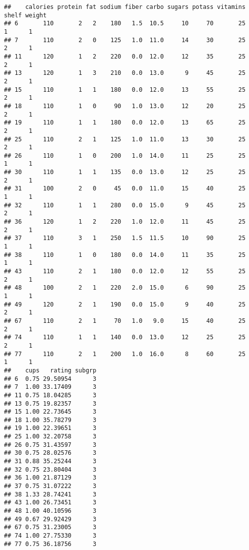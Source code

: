 \documentclass[
]{article}
\newenvironment{Shaded}{\begin{snugshade}}{\end{snugshade}}
\newcommand{\DecValTok}[1]{\textcolor[rgb]{0.00,0.00,0.81}{#1}}
\newcommand{\NormalTok}[1]{#1}
\newcommand{\SpecialCharTok}[1]{\textcolor[rgb]{0.00,0.00,0.00}{#1}}
\begin{document}
\begin{Shaded}
\end{Shaded}

\begin{verbatim}
##    calories protein fat sodium fiber carbo sugars potass vitamins shelf weight
## 6       110       2   2    180   1.5  10.5     10     70       25     1      1
## 7       110       2   0    125   1.0  11.0     14     30       25     2      1
## 11      120       1   2    220   0.0  12.0     12     35       25     2      1
## 13      120       1   3    210   0.0  13.0      9     45       25     2      1
## 15      110       1   1    180   0.0  12.0     13     55       25     2      1
## 18      110       1   0     90   1.0  13.0     12     20       25     2      1
## 19      110       1   1    180   0.0  12.0     13     65       25     2      1
## 25      110       2   1    125   1.0  11.0     13     30       25     2      1
## 26      110       1   0    200   1.0  14.0     11     25       25     1      1
## 30      110       1   1    135   0.0  13.0     12     25       25     2      1
## 31      100       2   0     45   0.0  11.0     15     40       25     1      1
## 32      110       1   1    280   0.0  15.0      9     45       25     2      1
## 36      120       1   2    220   1.0  12.0     11     45       25     2      1
## 37      110       3   1    250   1.5  11.5     10     90       25     1      1
## 38      110       1   0    180   0.0  14.0     11     35       25     1      1
## 43      110       2   1    180   0.0  12.0     12     55       25     2      1
## 48      100       2   1    220   2.0  15.0      6     90       25     1      1
## 49      120       2   1    190   0.0  15.0      9     40       25     2      1
## 67      110       2   1     70   1.0   9.0     15     40       25     2      1
## 74      110       1   1    140   0.0  13.0     12     25       25     2      1
## 77      110       2   1    200   1.0  16.0      8     60       25     1      1
##    cups   rating subgrp
## 6  0.75 29.50954      3
## 7  1.00 33.17409      3
## 11 0.75 18.04285      3
## 13 0.75 19.82357      3
## 15 1.00 22.73645      3
## 18 1.00 35.78279      3
## 19 1.00 22.39651      3
## 25 1.00 32.20758      3
## 26 0.75 31.43597      3
## 30 0.75 28.02576      3
## 31 0.88 35.25244      3
## 32 0.75 23.80404      3
## 36 1.00 21.87129      3
## 37 0.75 31.07222      3
## 38 1.33 28.74241      3
## 43 1.00 26.73451      3
## 48 1.00 40.10596      3
## 49 0.67 29.92429      3
## 67 0.75 31.23005      3
## 74 1.00 27.75330      3
## 77 0.75 36.18756      3
\end{verbatim}
\end{document}
